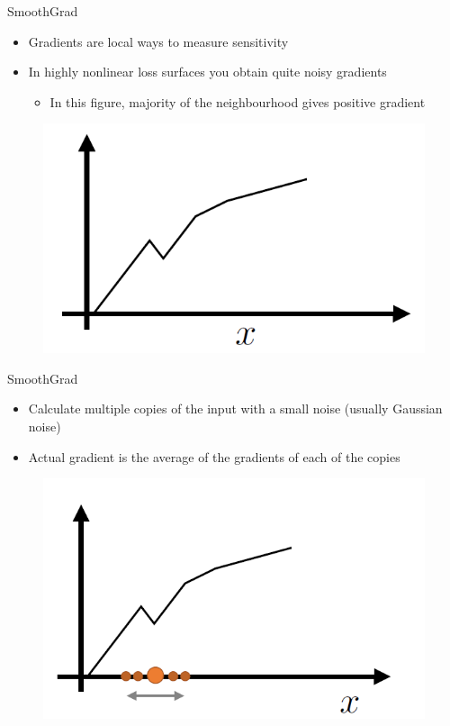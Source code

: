 \documentclass[11pt,compress,t,notes=noshow, aspectratio=169, xcolor=table]{beamer}
\begin{document}
\begin{frame}{SmoothGrad}
    \begin{itemize}
        \item Gradients are local ways to measure sensitivity
        \item In highly nonlinear loss surfaces you obtain quite noisy gradients
        \begin{itemize}
            \item In this figure, majority of the neighbourhood gives positive gradient
        \end{itemize}
    \end{itemize}
    \begin{figure}
        \centering
        \includegraphics[width=0.6\linewidth]{bild26}
    \end{figure}
\end{frame}

\begin{frame}{SmoothGrad}
    \begin{itemize}
        \item Calculate multiple copies of the input with a small noise (usually Gaussian noise)
        \item Actual gradient is the average of the gradients of each of the copies
    \end{itemize}
    \begin{figure}
        \centering
        \includegraphics[width=0.6\linewidth]{bild27}
    \end{figure}
\end{frame}
\end{document}
